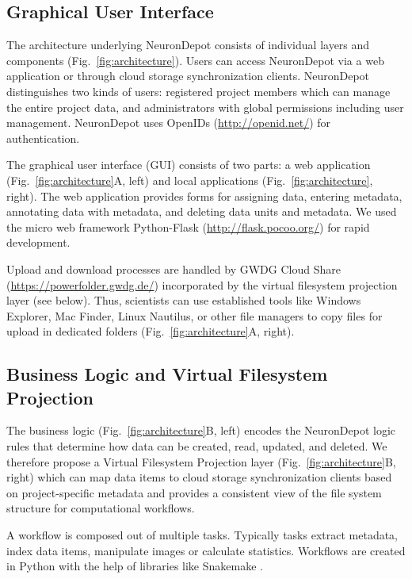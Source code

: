 \documentclass{frontiersSCNS} %
\begin{document}
\subsection{Graphical User Interface}
The architecture underlying NeuronDepot consists of individual layers and
components (Fig.~\ref{fig:architecture}). Users can access NeuronDepot via a
web application or through cloud storage synchronization clients. NeuronDepot
distinguishes two kinds of users: registered project members which can manage
the entire project data, and administrators with global permissions including
user management. NeuronDepot uses OpenIDs (\url{http://openid.net/}) for
authentication.

The graphical user interface (GUI) consists of two parts: a web application
(Fig.~\ref{fig:architecture}A, left) and local applications
(Fig.~\ref{fig:architecture}, right). The web application provides forms for
assigning data, entering metadata, annotating data with metadata, and deleting
data units and metadata. We used the micro web framework Python-Flask
(\url{http://flask.pocoo.org/}) for rapid development.

Upload and download processes are handled by GWDG Cloud Share
(\url{https://powerfolder.gwdg.de/}) incorporated by the virtual filesystem
projection layer (see below). Thus, scientists can use established tools like
Windows Explorer, Mac Finder, Linux Nautilus, or other file managers to copy
files for upload in dedicated folders (Fig.~\ref{fig:architecture}A, right).

\subsection{Business Logic and Virtual Filesystem Projection}\label{sec:projection_layer}

The business logic (Fig.~\ref{fig:architecture}B, left) encodes the NeuronDepot
logic rules that determine how data can be created, read, updated, and deleted.
We therefore propose a
Virtual Filesystem Projection layer (Fig.~\ref{fig:architecture}B, right) which
can map data items to cloud storage synchronization clients
based on project-specific metadata and provides a consistent view of the file
system structure for computational workflows.

A workflow is composed out of multiple tasks. Typically tasks extract metadata,
index data items, manipulate images or calculate statistics. Workflows are
created in Python with the help of libraries like Snakemake
\citep{Koester2012}.
\end{document}
